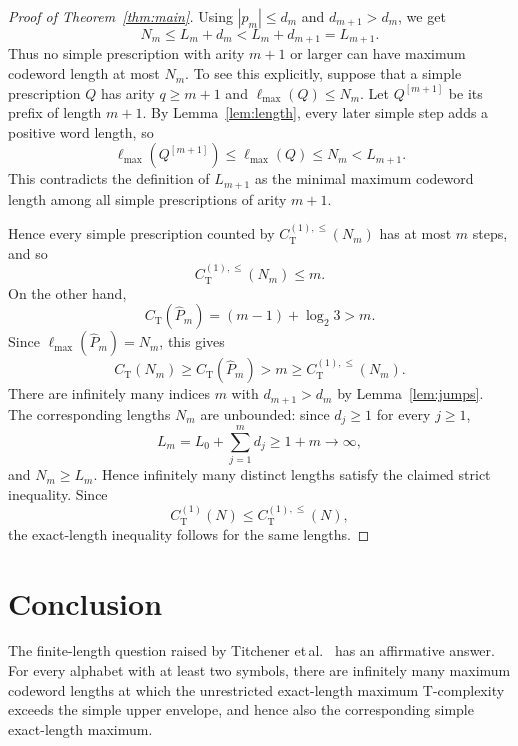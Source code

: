 \documentclass[11pt]{article}
\newcommand{\CT}{C_{\mathrm T}}
\newcommand{\CTsimp}{C_{\mathrm T}^{(1)}}
\newcommand{\CTsimpenv}{C_{\mathrm T}^{(1),\leq}}
\newcommand{\ellmax}{\ell_{\max}}
\begin{document}
\begin{proof}[Proof of Theorem~\ref{thm:main}]
Using $|p_m|\leq d_m$ and $d_{m+1}>d_m$, we get
\begin{equation}
N_m\leq L_m+d_m<L_m+d_{m+1}=L_{m+1}.
\end{equation}
Thus no simple prescription with arity $m+1$ or larger can have maximum codeword length at most $N_m$. To see this explicitly, suppose that a simple prescription $Q$ has arity $q\geq m+1$ and $\ellmax(Q)\leq N_m$. Let $Q^{[m+1]}$ be its prefix of length $m+1$. By Lemma~\ref{lem:length}, every later simple step adds a positive word length, so
\begin{equation}
\ellmax(Q^{[m+1]})\leq \ellmax(Q)\leq N_m<L_{m+1}.
\end{equation}
This contradicts the definition of $L_{m+1}$ as the minimal maximum codeword length among all simple prescriptions of arity $m+1$.

Hence every simple prescription counted by $\CTsimpenv(N_m)$ has at most $m$ steps, and so
\begin{equation}
\CTsimpenv(N_m)\leq m.
\end{equation}
On the other hand,
\begin{equation}
\CT(\widehat P_m)=(m-1)+\log_2 3>m.
\end{equation}
Since $\ellmax(\widehat P_m)=N_m$, this gives
\begin{equation}
\CT(N_m)\geq \CT(\widehat P_m)>m\geq \CTsimpenv(N_m).
\end{equation}
There are infinitely many indices $m$ with $d_{m+1}>d_m$ by Lemma~\ref{lem:jumps}. The corresponding lengths $N_m$ are unbounded: since $d_j\geq 1$ for every $j\geq 1$,
\begin{equation}
L_m=L_0+\sum_{j=1}^{m}d_j\geq 1+m\longrightarrow\infty,
\end{equation}
and $N_m\geq L_m$. Hence infinitely many distinct lengths satisfy the claimed strict inequality. Since
\begin{equation}
\CTsimp(N)\leq \CTsimpenv(N),
\end{equation}
the exact-length inequality follows for the same lengths.
\end{proof}

\section{Conclusion}

The finite-length question raised by Titchener et\,al.~\cite[Sec.~11]{TitchenerEtAl2005}
has an affirmative answer. For every alphabet with at least two symbols, there are
infinitely many maximum codeword lengths at which the unrestricted exact-length
maximum T-complexity exceeds the simple upper envelope, and hence also the
corresponding simple exact-length maximum.
\end{document}
